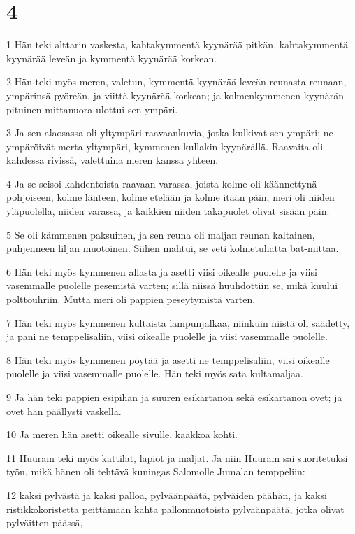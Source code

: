 \chapter{4}

\par 1 Hän teki alttarin vaskesta, kahtakymmentä kyynärää pitkän, kahtakymmentä kyynärää leveän ja kymmentä kyynärää korkean.
\par 2 Hän teki myös meren, valetun, kymmentä kyynärää leveän reunasta reunaan, ympärinsä pyöreän, ja viittä kyynärää korkean; ja kolmenkymmenen kyynärän pituinen mittanuora ulottui sen ympäri.
\par 3 Ja sen alaosassa oli yltympäri raavaankuvia, jotka kulkivat sen ympäri; ne ympäröivät merta yltympäri, kymmenen kullakin kyynärällä. Raavaita oli kahdessa rivissä, valettuina meren kanssa yhteen.
\par 4 Ja se seisoi kahdentoista raavaan varassa, joista kolme oli käännettynä pohjoiseen, kolme länteen, kolme etelään ja kolme itään päin; meri oli niiden yläpuolella, niiden varassa, ja kaikkien niiden takapuolet olivat sisään päin.
\par 5 Se oli kämmenen paksuinen, ja sen reuna oli maljan reunan kaltainen, puhjenneen liljan muotoinen. Siihen mahtui, se veti kolmetuhatta bat-mittaa.
\par 6 Hän teki myös kymmenen allasta ja asetti viisi oikealle puolelle ja viisi vasemmalle puolelle pesemistä varten; sillä niissä huuhdottiin se, mikä kuului polttouhriin. Mutta meri oli pappien peseytymistä varten.
\par 7 Hän teki myös kymmenen kultaista lampunjalkaa, niinkuin niistä oli säädetty, ja pani ne temppelisaliin, viisi oikealle puolelle ja viisi vasemmalle puolelle.
\par 8 Hän teki myös kymmenen pöytää ja asetti ne temppelisaliin, viisi oikealle puolelle ja viisi vasemmalle puolelle. Hän teki myös sata kultamaljaa.
\par 9 Ja hän teki pappien esipihan ja suuren esikartanon sekä esikartanon ovet; ja ovet hän päällysti vaskella.
\par 10 Ja meren hän asetti oikealle sivulle, kaakkoa kohti.
\par 11 Huuram teki myös kattilat, lapiot ja maljat. Ja niin Huuram sai suoritetuksi työn, mikä hänen oli tehtävä kuningas Salomolle Jumalan temppeliin:
\par 12 kaksi pylvästä ja kaksi palloa, pylväänpäätä, pylväiden päähän, ja kaksi ristikkokoristetta peittämään kahta pallonmuotoista pylväänpäätä, jotka olivat pylväitten päässä,

